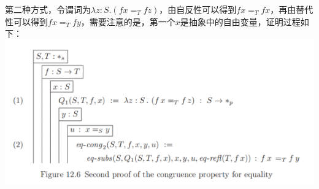 \documentclass[UTF8]{article}
\begin{document}
		第二种方式，令谓词为$\lambda z:S.(fx=_T fz)$，由自反性可以得到$fx=_T fx$，再由替代性可以得到$fx=_T fy$，需要注意的是，第一个$x$是抽象中的自由变量，证明过程如下：\\
		\includegraphics[width=0.93\linewidth]{"../imgs/12-6.png"}
\end{document}

